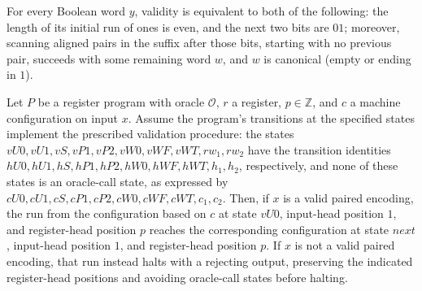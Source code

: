 \begin{lemma}
\label{Complexity.LogProg.validPair_iff}
\leanok
{}
For every Boolean word $y$, validity is equivalent to both of the following: the length
of its initial run of ones is even, and the next two bits are $01$; moreover, scanning
aligned pairs in the suffix after those bits, starting with no previous pair, succeeds
with some remaining word $w$, and $w$ is canonical (empty or ending in $1$).
\end{lemma}

\begin{lemma}
\label{Complexity.LogProg.valPair_run}
\leanok
{}
Let $P$ be a register program with oracle $\mathcal O$, $r$ a register, $p\in\mathbb Z$,
and $c$ a machine configuration on input $x$. Assume the program's transitions at the
specified states implement the prescribed validation procedure: the states
$vU0,vU1,vS,vP1,vP2,vW0,vWF,vWT,rw_1,rw_2$ have the transition identities
$hU0,hU1,hS,hP1,hP2,hW0,hWF,hWT,h_1,h_2$, respectively, and none of these states is an
oracle-call state, as expressed by $cU0,cU1,cS,cP1,cP2,cW0,cWF,cWT,c_1,c_2$. Then, if
$x$ is a valid paired encoding, the run from the configuration based on $c$ at state
$vU0$, input-head position $1$, and register-head position $p$ reaches the corresponding
configuration at state $next$, input-head position $1$, and register-head position $p$.
If $x$ is not a valid paired encoding, that run instead halts with a rejecting output,
preserving the indicated register-head positions and avoiding oracle-call states before
halting.
\end{lemma}
